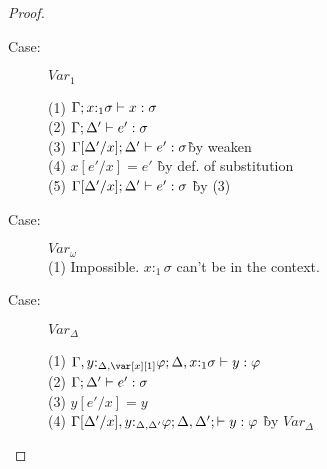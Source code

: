 \begin{proof}
\begin{description}

\item[Case:] $Var_1$
\begin{tabbing}
  (1) $\Gamma;x{:}_1\sigma \vdash x : \sigma$\\
  (2) $\Gamma;\Delta' \vdash e' : \sigma$\\
  (3) $\Gamma[\Delta'/x]; \Delta' \vdash e' : \sigma$\` by weaken\\
  (4) $x[e'/x] = e'$ \` by def. of substitution\\
  (5) $\Gamma[\Delta'/x];\Delta' \vdash e' : \sigma$ \` by (3)\\
\end{tabbing}

\item[Case:] $Var_\omega$\\
  (1) Impossible. $x{:}_1\sigma$ can't be in the context.\\

\item[Case:] $Var_\Delta$
\begin{tabbing}
  (1) $\G,y{:}_{\Delta,\xl}\varphi; \D, x{:}_1\sigma \vdash y : \varphi$\\
  (2) $\Gamma; \Delta' \vdash e' : \sigma$\\
  (3) $y[e'/x] = y$\\
  (4) $\Gamma[\Delta'/x],y{:}_{\Delta,\Delta'}\varphi; \Delta,\Delta'; \vdash y : \varphi$ \` by $Var_\Delta$\\
\end{tabbing}


\end{description}
\end{proof}
